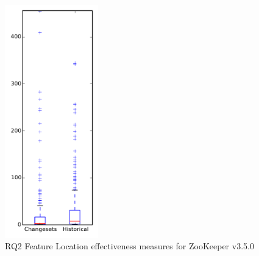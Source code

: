 
\begin{figure}[t]
\centering
\includegraphics[width=0.36\textwidth]{figures/flt/rq2_zookeeper}
\caption{RQ2 Feature Location effectiveness measures for ZooKeeper v3.5.0}
\label{fig:flt:rq2:zookeeper}
\end{figure}
